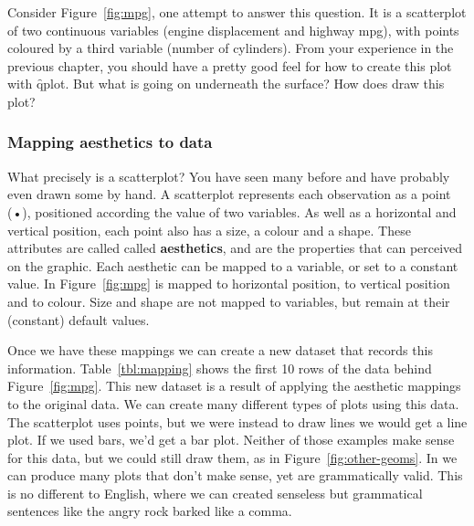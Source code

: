 Consider Figure~\ref{fig:mpg}, one attempt to answer this question.  It is a scatterplot of two continuous variables (engine displacement and highway mpg), with points coloured by a third variable (number of cylinders).  From your experience in the previous chapter, you should have a pretty good feel for how to create this plot with \f{qplot}.  But what is going on underneath the surface?  How does \ggplot draw this plot?

% 
% 


\subsubsection{Mapping aesthetics to data}

What precisely is a scatterplot? You have seen many before and have probably even drawn some by hand. A scatterplot represents each observation as a point (•), positioned according the value of two variables. As well as a horizontal and vertical position, each point also has a size, a colour and a shape. These attributes are called called {\bf aesthetics}, and are the properties that can perceived on the graphic. Each aesthetic can be mapped to a variable, or set to a constant value. In Figure~\ref{fig:mpg}  is mapped to horizontal position,  to vertical position and  to colour. Size and shape are not mapped to variables, but remain at their (constant) default values.

Once we have these mappings we can create a new dataset that records this information. Table~\ref{tbl:mapping} shows the first 10 rows of the data behind Figure~\ref{fig:mpg}. This new dataset is a result of applying the aesthetic mappings to the original data. We can create many different types of plots using this data. The scatterplot uses points, but we were instead to draw lines we would get a line plot. If we used bars, we'd get a bar plot. Neither of those examples make sense for this data, but we could still draw them, as in Figure~\ref{fig:other-geoms}. In \ggplot we can produce many  plots that don't make sense, yet are grammatically valid.  This is no different to English, where we can created senseless but grammatical sentences like the angry rock barked like a comma.

